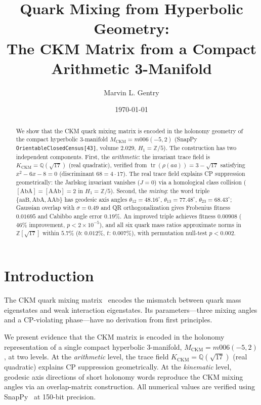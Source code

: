 \documentclass[11pt,a4paper]{article}
\begin{document}
\title{Quark Mixing from Hyperbolic Geometry:\\
The CKM Matrix from a Compact Arithmetic 3-Manifold}

\author[1]{Marvin L. Gentry}
\date{\today}

\begin{abstract}
We show that the CKM quark mixing matrix is encoded in the holonomy
geometry of the compact hyperbolic 3-manifold $M_{\mathrm{CKM}} =
m006(-5,2)$ (SnapPy \texttt{OrientableClosedCensus[43]}, volume
$2.029$, $H_1=\mathbb{Z}/5$).
The construction has two independent components.
First, the \emph{arithmetic}: the invariant trace field is
$K_{\mathrm{CKM}}=\mathbb{Q}(\sqrt{17})$ (real quadratic), verified
from $\operatorname{tr}(\rho(aa))=3-\sqrt{17}$ satisfying
$x^2-6x-8=0$ (discriminant $68=4\cdot17$).
The real trace field explains CP suppression geometrically: the
Jarlskog invariant vanishes ($J=0$) via a homological class collision
($[\mathrm{AbA}]=[\mathrm{AAb}]=2$ in $H_1=\mathbb{Z}/5$).
Second, the \emph{mixing}: the word triple
$\{\mathrm{aaB},\mathrm{AbA},\mathrm{AAb}\}$ has geodesic axis angles
$\theta_{12}=48.16^\circ$, $\theta_{13}=77.48^\circ$,
$\theta_{23}=68.43^\circ$; Gaussian overlap with $\sigma=0.49$ and QR
orthogonalization gives Frobenius fitness $0.01695$ and Cabibbo angle
error $0.19\%$.
An improved triple achieves fitness $0.00908$ ($46\%$ improvement,
$p<2\times10^{-5}$), and all six quark mass ratios approximate norms
in $\mathbb{Z}[\sqrt{17}]$ within $5.7\%$ ($b$: $0.012\%$, $t$:
$0.007\%$), with permutation null-test $p<0.002$.
\end{abstract}

\maketitle

\section{Introduction}
\label{sec:intro}

The CKM quark mixing matrix~\cite{Cabibbo1963,KobayashiMaskawa1973}
encodes the mismatch between quark mass eigenstates and weak
interaction eigenstates. Its parameters---three mixing angles and a
CP-violating phase---have no derivation from first principles.

We present evidence that the CKM matrix is encoded in the holonomy
representation of a single compact hyperbolic 3-manifold,
$M_{\mathrm{CKM}} = m006(-5,2)$, at two levels.
At the \emph{arithmetic} level, the trace field
$K_{\mathrm{CKM}} = \mathbb{Q}(\sqrt{17})$ (real quadratic) explains
CP suppression geometrically.
At the \emph{kinematic} level, geodesic axis directions of short
holonomy words reproduce the CKM mixing angles via an overlap-matrix
construction.
All numerical values are verified using SnapPy~\cite{SnapPy} at
150-bit precision.
\end{document}
